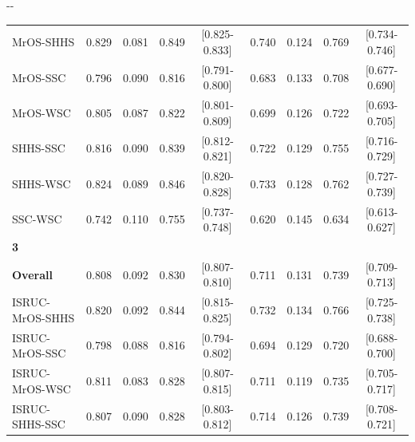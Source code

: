 \begin{table}[p]
\begin{adjustwidth*}{}{-\marginparwidth-\marginparsep}
\begin{threeparttable}
\begin{tabular}{@{}lcccccccc@{}}
\acs{MrOS}-\acs{SHHS}                 & 0.829         & 0.081       & 0.849           & [0.825-0.833]         & 0.740         & 0.124       & 0.769           & [0.734-0.746]         \\
\acs{MrOS}-\acs{SSC}                  & 0.796         & 0.090       & 0.816           & [0.791-0.800]         & 0.683         & 0.133       & 0.708           & [0.677-0.690]         \\
\acs{MrOS}-\acs{WSC}                  & 0.805         & 0.087       & 0.822           & [0.801-0.809]         & 0.699         & 0.126       & 0.722           & [0.693-0.705]         \\
\acs{SHHS}-\acs{SSC}                  & 0.816         & 0.090       & 0.839           & [0.812-0.821]         & 0.722         & 0.129       & 0.755           & [0.716-0.729]         \\
\acs{SHHS}-\acs{WSC}                  & 0.824         & 0.089       & 0.846           & [0.820-0.828]         & 0.733         & 0.128       & 0.762           & [0.727-0.739]         \\
\acs{SSC}-\acs{WSC}                   & 0.742         & 0.110       & 0.755           & [0.737-0.748]         & 0.620         & 0.145       & 0.634           & [0.613-0.627]         \\
\textbf{3}                &               &             &                 &                       &               &             &                 &                       \\
\textbf{Overall}          & 0.808         & 0.092       & 0.830           & [0.807-0.810]         & 0.711         & 0.131       & 0.739           & [0.709-0.713]         \\
\acs{ISRUC}-\acs{MrOS}-\acs{SHHS}           & 0.820         & 0.092       & 0.844           & [0.815-0.825]         & 0.732         & 0.134       & 0.766           & [0.725-0.738]         \\
\acs{ISRUC}-\acs{MrOS}-\acs{SSC}            & 0.798         & 0.088       & 0.816           & [0.794-0.802]         & 0.694         & 0.129       & 0.720           & [0.688-0.700]         \\
\acs{ISRUC}-\acs{MrOS}-\acs{WSC}            & 0.811         & 0.083       & 0.828           & [0.807-0.815]         & 0.711         & 0.119       & 0.735           & [0.705-0.717]         \\
\acs{ISRUC}-\acs{SHHS}-\acs{SSC}            & 0.807         & 0.090       & 0.828           & [0.803-0.812]         & 0.714         & 0.126       & 0.739           & [0.708-0.721]         \\

\end{tabular}
\end{threeparttable}
\end{adjustwidth*}
\end{table}
